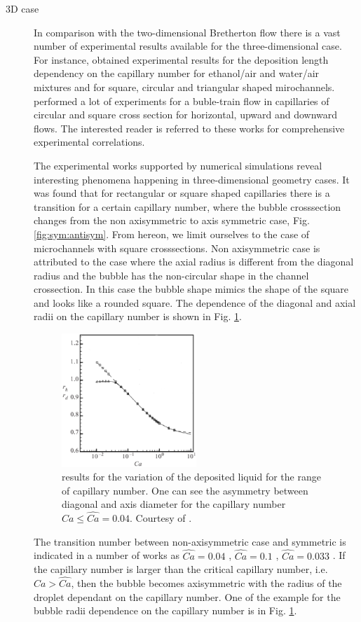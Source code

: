 \documentclass{CFD2011}
\begin{document}
\begin{description}
\item[3D case]
In comparison with the two-dimensional Bretherton flow there is a vast number of experimental
results available for the three-dimensional case. For instance, \citet{shikazono-square} obtained
experimental
results for the deposition length dependency on the
capillary number for ethanol/air and water/air mixtures and for square, circular and triangular
shaped mirochannels. \citet{cerro-bubble-train} performed a lot of experiments for a buble-train
flow in capillaries of
circular and square cross section for horizontal, upward and downward flows. The interested reader
is referred to these works for comprehensive experimental correlations.

The experimental works supported by numerical simulations reveal interesting phenomena happening in
three-dimensional geometry cases. It was found \cite{heil-threedim,wong-films} that for rectangular
or square shaped capillaries there is a transition for a
certain capillary number, where the bubble crosssection changes from the non axisymmetric to axis
symmetric case,
Fig. \ref{fig:sym:antisym}.
From hereon, we limit ourselves to the case of microchannels with square crosssections.
Non axisymmetric case is attributed to the case where the axial radius is different from the
diagonal radius and the bubble has the non-circular shape in the channel crossection. In this case
the bubble shape mimics the shape of the square and looks like a rounded square. The dependence
of the diagonal and axial radii on the capillary number is shown in Fig. 
\ref{fig:heil:three:dim}.
\begin{figure}[ht]
\includegraphics[width=0.5\textwidth]{Figures/capillary_width_heil.eps}
\caption{\citet{heil-threedim} results for the variation of the deposited liquid for the range of
capillary number. One can see the asymmetry between diagonal and axis diameter for the capillary
number $Ca\leq\hat{Ca}=0.04$. Courtesy of \citet{heil-threedim}. \label{fig:heil:three:dim}}
\end{figure}
The transition number between non-axisymmetric case and symmetric is indicated in a number of
works as $\widehat{Ca}=0.04$ \cite{cerro-bubble-train},
$\widehat{Ca}=0.1$
\cite{cerro-space}, $\widehat{Ca}=0.033$ \cite{heil-threedim}. If the capillary number is larger
than
the critical capillary number, i.e. $Ca>\widehat{Ca}$, then the bubble becomes axisymmetric with the
radius of the droplet dependant on the capillary number. One of the example for the bubble radii
dependence on the capillary number is in Fig. \ref{fig:heil:three:dim}.


\end{description}
\end{document}
